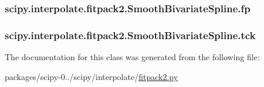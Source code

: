 \subsubsection[{fp}]{\setlength{\rightskip}{0pt plus 5cm}scipy.\+interpolate.\+fitpack2.\+Smooth\+Bivariate\+Spline.\+fp}\label{classscipy_1_1interpolate_1_1fitpack2_1_1SmoothBivariateSpline_ac327a5d375e78d0371ee8d620bb5bd0b}
\hypertarget{classscipy_1_1interpolate_1_1fitpack2_1_1SmoothBivariateSpline_a7b6a3bbcf8998bc9d9267532087d77e4}{}
\subsubsection[{tck}]{\setlength{\rightskip}{0pt plus 5cm}scipy.\+interpolate.\+fitpack2.\+Smooth\+Bivariate\+Spline.\+tck}\label{classscipy_1_1interpolate_1_1fitpack2_1_1SmoothBivariateSpline_a7b6a3bbcf8998bc9d9267532087d77e4}


The documentation for this class was generated from the following file\+:\begin{DoxyCompactItemize}
\item 
packages/scipy-\/0../scipy/interpolate/\hyperlink{fitpack2_8py}{fitpack2.\+py}\end{DoxyCompactItemize}
